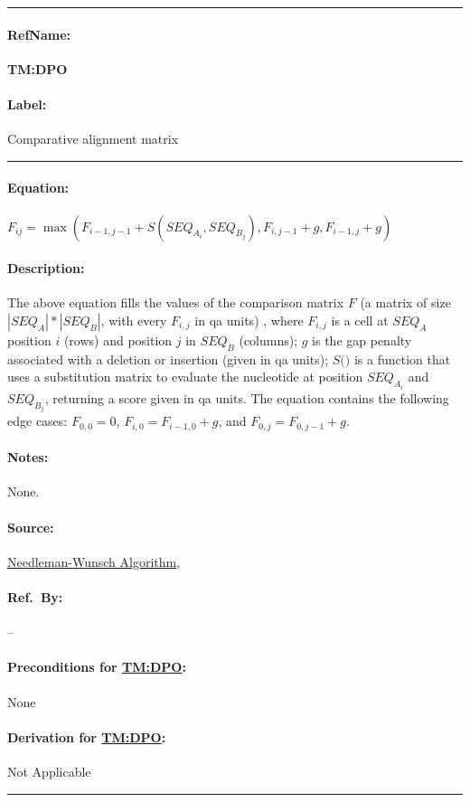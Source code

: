 \documentclass[12pt]{article}
\newcommand{\dref}[1]{GD\ref{#1}}
\newcommand{\aref}[1]{A\ref{#1}}
\newcommand{\deftheory}[9][Not Applicable]
{
\newpage
\noindent \rule{\textwidth}{0.5mm}

\paragraph{RefName: } \textbf{#2} \phantomsection 
\label{#2}

\paragraph{Label:} #3

\noindent \rule{\textwidth}{0.5mm}

\paragraph{Equation:}

#4

\paragraph{Description:}

#5

\paragraph{Notes:}

#6

\paragraph{Source:}

#7

\paragraph{Ref.\ By:}

#8

\paragraph{Preconditions for \hyperref[#2]{#2}:}
\label{#2_precond}

#9

\paragraph{Derivation for \hyperref[#2]{#2}:}
\label{#2_deriv}

#1

\noindent \rule{\textwidth}{0.5mm}

}
\begin{document}
\noindent
\deftheory
{TM:DPO}
{Comparative alignment matrix}
{
  $F_{ij} = \max(F_{i-1,j-1} + S(SEQ_{A_i}, SEQ_{B_j}), F_{i,j-1} + g, F_{i-1,j} + g)$
}
{

  The above equation fills the values of the comparison matrix $F$ (a matrix of size $|SEQ_A| * |SEQ_B|$, with every $F_{i,j}$ in qa units)
  , where $F_{i,j}$ is a cell at $SEQ_A$ position $i$ (rows) and position $j$ in $SEQ_B$ 
   (columns); $g$ is the gap penalty associated with a deletion 
  or insertion (given in qa units); $ S \text{()} $ is a function that uses a substitution matrix to evaluate the
  nucleotide at position $SEQ_{A_i}$ and $SEQ_{B_j}$, returning a score given in qa units. The equation contains the 
  following edge cases: $F_{0,0} = 0$, $F_{i,0} = F_{i-1,0} + g$, and $F_{0,j} = F_{0,j-1} + g$.

  
}
{
None.
}
{
  \href{https://en.wikipedia.org/wiki/Needleman-Wunsch_algorithm}{Needleman-Wunsch Algorithm}, \cite{NEEDLEMAN1970443}
}
{
  --
}
{
None
}
{}
\end{document}

